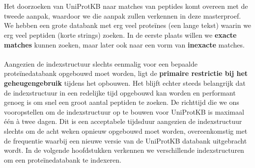 \\ \\
Het doorzoeken van UniProtKB naar matches van peptides komt overeen met de tweede aanpak, waardoor we die aanpak zullen verkennen in deze masterproef.
We hebben een grote databank met erg veel proteïnes (een lange tekst) waarin we erg veel peptiden (korte strings) zoeken.
In de eerste plaats willen we \textbf{exacte matches} kunnen zoeken, maar later ook naar een vorm van \textbf{inexacte} matches.
\\ \\
Aangezien de indexstructuur slechts eenmalig voor een bepaalde proteïnedatabank opgebouwd moet worden, ligt de \textbf{primaire restrictie bij het geheugengebruik} tijdens het opbouwen.
Het blijft echter steeds belangrijk dat de indexstructuur in een redelijke tijd opgebouwd kan worden en performant genoeg is om snel een groot aantal peptiden te zoeken.
De richttijd die we ons vooropstellen om de indexstructuur op te bouwen voor UniProtKB is maximaal één à twee dagen.
Dit is een acceptabele tijdsduur aangezien de indexstructuur slechts om de acht weken opnieuw opgebouwd moet worden, overeenkomstig met de frequentie waarbij een nieuwe versie van de UniProtKB databank uitgebracht wordt.
In de volgende hoofdstukken verkennen we verschillende indexstructuren om een proteïnedatabank te indexeren.